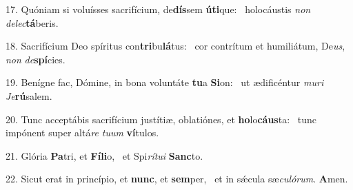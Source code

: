 17. Quóniam si voluísses sacrifícium, de\textbf{dís}sem \textbf{ú}\textbf{ti}que: \ast\  holocáustis \textit{non} \textit{de}\textit{lec}\textbf{tá}beris.\

18. Sacrifícium Deo spíritus con\textbf{tri}bu\textbf{lá}tus: \ast\  cor contrítum et humiliátum, De\textit{us}, \textit{non} \textit{de}\textbf{spí}cies.\

19. Benígne fac, Dómine, in bona voluntáte \textbf{tu}a \textbf{Si}on: \ast\  ut ædificéntur \textit{mu}\textit{ri} \textit{Je}\textbf{rú}salem.\

20. Tunc acceptábis sacrifícium justítiæ, oblatiónes, et \textbf{ho}lo\textbf{cáus}ta: \ast\  tunc impónent super altá\textit{re} \textit{tu}\textit{um} \textbf{ví}tulos.\

21. Glória \textbf{Pa}tri, et \textbf{Fí}\textbf{li}o, \ast\  et Spi\textit{rí}\textit{tu}\textit{i} \textbf{Sanc}to.\

22. Sicut erat in princípio, et \textbf{nunc}, et \textbf{sem}per, \ast\  et in sǽcula sæ\textit{cu}\textit{ló}\textit{rum}. \textbf{A}men.\

